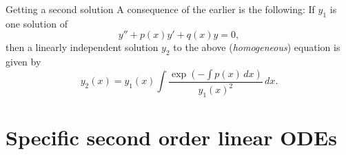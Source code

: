 \documentclass[dvipsnames, handout]{beamer}
\theoremstyle{definition}
\begin{document}
\begin{frame}{Getting a second solution}
  A consequence of the earlier is the following: \pause If $y_{1}$ is one solution of
  \begin{equation*} 
    y'' + p(x) y' + q(x) y = 0,
  \end{equation*} \pause 
  then a linearly independent solution $y_{2}$ to the above (\emph{homogeneous}) equation is given by \pause
  \begin{equation*} 
    y_{2}(x) = y_{1}(x) \int \frac{\exp\left(-\int p(x) \, dx\right)}{y_{1}(x)^{2}} \, dx.
  \end{equation*}
\end{frame}

\section{Specific second order linear ODEs}
\end{document}
